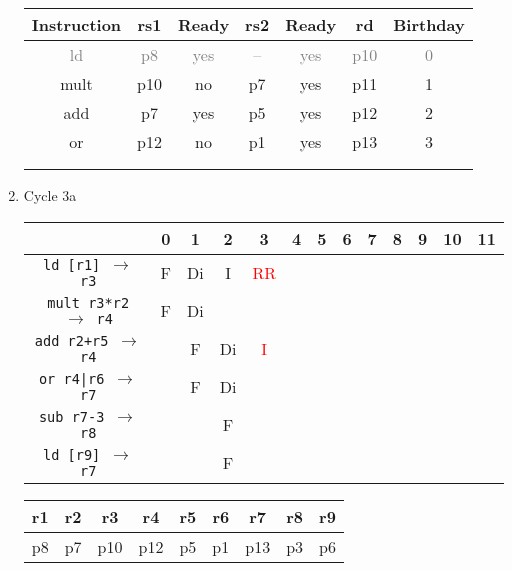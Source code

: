 \documentclass[12pt]{article}
\begin{document}
\begin{enumerate}
\begin{table}[H]
\begin{tabular}{|c|c|c|c|c|c|c|}
					Instruction & rs1 & Ready & rs2 & Ready & rd & Birthday\\
					\hline
					\textcolor{gray}{ld} & \textcolor{gray}{p8} & \textcolor{gray}{yes} & \textcolor{gray}{--} & \textcolor{gray}{yes} & \textcolor{gray}{p10} & \textcolor{gray}{0}\\
					\hline
					mult & p10 & no & p7 & yes & p11 & 1\\
					\hline
					add & p7 & yes & p5 & yes & p12 & 2\\
					\hline
					or & p12 & no & p1 & yes & p13 & 3\\
					\hline
					 &  &  &  &  &  & \\
					\hline
					 &  &  &  &  &  & \\
					\hline
				\end{tabular}
			\end{table}
		\item
			Cycle 3a
			\begin{table}[H]
				\begin{tabular}{|c|c|c|c|c|c|c|c|c|c|c|c|c|}
					\hline
					 & 0 & 1 & 2 & 3 & 4 & 5 & 6 & 7 & 8 & 9 & 10 & 11\\
					\hline
					\texttt{ld [r1] $\rightarrow$ r3} & F & Di & I & \textcolor{red}{RR} &  &  &  &  &  &  &  &\\
					\hline
					\texttt{mult r3*r2 $\rightarrow$ r4} & F & Di &  &  &  &  &  &  &  &  &  &\\
					\hline
					\texttt{add r2+r5 $\rightarrow$ r4} &  & F & Di & \textcolor{red}{I} &  &  &  &  &  &  &  &\\
					\hline
					\texttt{or r4|r6 $\rightarrow$ r7} &  & F & Di &  &  &  &  &  &  &  &  &\\
					\hline
					\texttt{sub r7-3 $\rightarrow$ r8} &  &  & F &  &  &  &  &  &  &  &  &\\
					\hline
					\texttt{ld [r9] $\rightarrow$ r7} &  &  & F &  &  &  &  &  &  &  &  &\\
					\hline 
				\end{tabular}
			\end{table}
			\begin{table}[H]
				\begin{tabular}{|c|c|c|c|c|c|c|c|c|}
					\hline
					r1 & r2 & r3 & r4 & r5 & r6 & r7 & r8 & r9\\
					\hline
					p8 & p7 & p10 & p12 & p5 & p1 & p13 & p3 & p6\\
					\hline
				\end{tabular}
			\end{table}

\end{enumerate}
\end{document}
